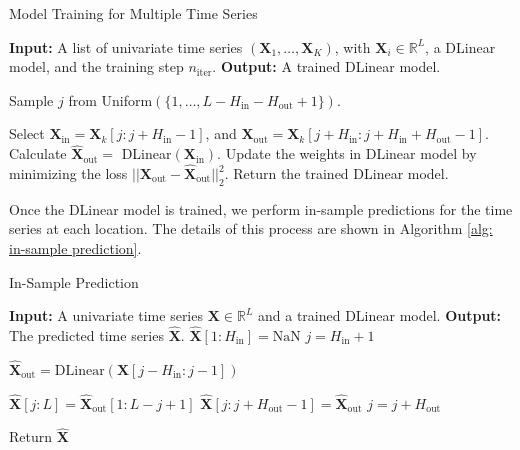 \documentclass[11pt]{article}
\begin{document}
\begin{algorithm}
\caption{Model Training for Multiple Time Series}\label{alg: nn training for multiple time series}
\begin{algorithmic}[1] %
\State \textbf{Input:} A list of univariate time series $(\bm{X}_1,\ldots,\bm{X}_K)$, with $\bm{X}_i \in \mathbb{R}^L$, a DLinear model, and the training step $n_{\mathrm{iter}}$.
\State \textbf{Output:} A trained DLinear model.

    \State Sample $j$ from Uniform$(\{1, \ldots, L-H_{\mathrm{in}}-H_{\mathrm{out}}+1\})$.

    \State Select $\bm{X}_{\mathrm{in}} = \bm{X}_k[j:j+H_{\mathrm{in}}-1]$, and $\bm{X}_{\mathrm{out}} = \bm{X}_k[j+H_{\mathrm{in}}:j+H_{\mathrm{in}}+H_{\mathrm{out}}-1]$.
    \State Calculate $\hat{\bm{X}}_{\mathrm{out}} =$ DLinear$(\bm{X}_{\mathrm{in}})$.
    \State Update the weights in DLinear model by minimizing the loss $||\bm{X}_{\mathrm{out}} - \hat{\bm{X}}_{\mathrm{out}}||^2_2$.
    \EndFor
\EndFor
\State Return the trained DLinear model.
\end{algorithmic}
\end{algorithm}





Once the DLinear model is trained, we perform in-sample predictions for the time series at each location. The details of this process are shown in Algorithm \ref{alg: in-sample prediction}.

\begin{algorithm}
\caption{In-Sample Prediction}\label{alg: in-sample prediction}
\begin{algorithmic}[1] %
\State \textbf{Input:} A univariate time series $\bm{X} \in \mathbb{R}^L$ and a trained DLinear model.
\State \textbf{Output:} The predicted time series $\hat{\bm{X}}$.
\State $\hat{\bm{X}}[1:H_{\mathrm{in}}] = \mathrm{NaN}$ %
\State $j = H_{\mathrm{in}} + 1$ %

    \State $\hat{\bm{X}}_{\mathrm{out}} = \mathrm{DLinear}(\bm{X}[j-H_{\mathrm{in}}:j-1])$ %

        \State $\hat{\bm{X}}[j:L] = \hat{\bm{X}}_{\mathrm{out}}[1:L-j+1]$ %
    \Else
        \State $\hat{\bm{X}}[j:j+H_{\mathrm{out}}-1] = \hat{\bm{X}}_{\mathrm{out}}$
    \EndIf
    \State $j = j + H_{\mathrm{out}}$ %
\EndWhile

\State Return $\hat{\bm{X}}$
\end{algorithmic}
\end{algorithm}
\end{document}
